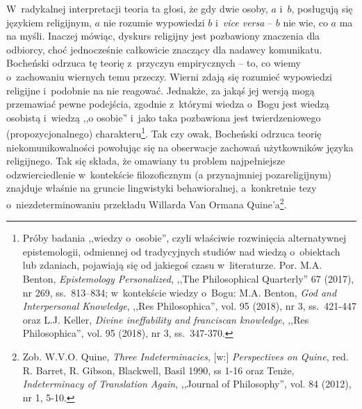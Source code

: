 W~radykalnej interpretacji teoria ta głosi, że gdy dwie osoby, $a$ i~$b$, posługują się językiem religijnym, $a$ nie rozumie wypowiedzi $b$ i~\textit{vice versa} -- $b$ nie wie, co $a$ ma na myśli. Inaczej mówiąc, dyskurs religijny jest pozbawiony znaczenia dla odbiorcy, choć jednocześnie całkowicie znaczący dla nadawcy komunikatu. Bocheński odrzuca tę teorię z~przyczyn empirycznych -- to, co wiemy o~zachowaniu wiernych temu przeczy. Wierni zdają się rozumieć wypowiedzi religijne i~podobnie na nie reagować. Jednakże, za jakąś jej wersją mogą przemawiać pewne podejścia, zgodnie z~którymi wiedza o~Bogu jest wiedzą osobistą i~wiedzą ,,o osobie'' i~jako taka pozbawiona jest twierdzeniowego (propozycjonalnego) charakteru\footnote{Próby badania ,,wiedzy o~osobie'', czyli właściwie rozwinięcia alternatywnej epistemologii, odmiennej od tradycyjnych studiów nad wiedzą o~obiektach lub zdaniach, pojawiają się od jakiegoś czasu w~literaturze. Por. M.A. Benton, \textit{Epistemology Personalized}, ,,The Philosophical Quarterly'' 67 (2017), nr 269, ss.~813–834; w~kontekście wiedzy o~Bogu: M.A. Benton, \textit{God and Interpersonal Knowledge}, ,,Res Philosophica'', vol. 95 (2018), nr 3, ss.~421-447 oraz L.J. Keller, \textit{Divine ineffability and franciscan knowledge}, ,,Res Philosophica'', vol. 95 (2018), nr 3, ss.~347-370.}. Tak czy owak, Bocheński odrzuca teorię niekomunikowalności powołując się na obserwacje zachowań użytkowników języka religijnego. Tak się składa, że omawiany tu problem najpełniejsze odzwierciedlenie w~kontekście filozoficznym (a przynajmniej pozareligijnym) znajduje właśnie na gruncie lingwistyki behawioralnej, a~konkretnie tezy o~niezdeterminowaniu przekładu Willarda Van Ormana Quine'a\footnote{Zob. W.V.O. Quine, \textit{Three Indeterminacies}, [w:] \textit{Perspectives on Quine}, red. R. Barret, R. Gibson, Blackwell, Basil 1990, ss 1-16 oraz Tenże, \textit{Indeterminacy of Translation Again}, ,,Journal of Philosophy'', vol. 84 (2012), nr 1, 5-10.}.

